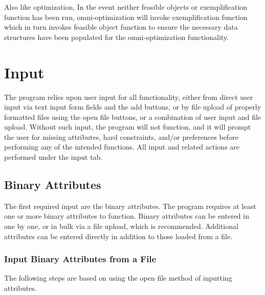 \documentclass[12pt]{report}
\begin{document}
Also like optimization, In the event neither feasible objects or exemplification function has been run, omni-optimization will invoke exemplification function which in turn invokes feasible object function to ensure the necessary data structures have been populated for the omni-optimization functionality. 

\chapter{Input}
The program relies upon user input for all functionality, either from direct user input via text input form fields and the add buttons, or by file upload of properly formatted files using the open file buttons, or a combination of user input and file upload. Without such input, the program will not function, and it will prompt the user for missing attributes, hard constraints, and/or preferences before performing any of the intended functions. All input and related actions are performed under the input tab.

\section{Binary Attributes}
The first required input are the binary attributes. The program requires at least one or more binary attributes to function. Binary attributes can be entered in one by one, or in bulk via a file upload, which is recommended. Additional attributes can be entered directly in addition to those loaded from a file.

\newpage
\subsection{Input Binary Attributes from a File}
The following steps are based on using the open file method of inputting attributes.\\
\end{document}
